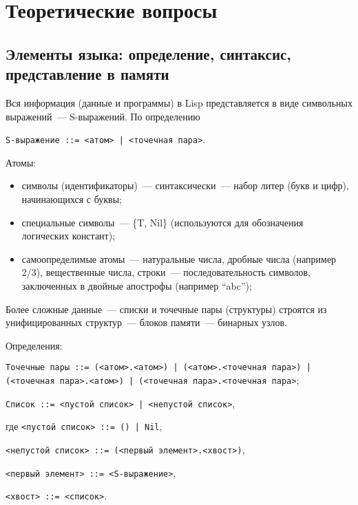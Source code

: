 \chapter{Теоретические вопросы}

\section{Элементы языка: определение, синтаксис, представление в памяти}

Вся информация (данные и программы) в Lisp представляется в виде символьных выражений~--- S-выражений. По определению
\begin{center}
	\texttt{S-выражение ::= <атом> | <точечная пара>}.
\end{center}

Атомы:
\begin{itemize}
	\item символы (идентификаторы)~--- синтаксически~--- набор литер (букв и цифр), начинающихся с буквы;
	\item специальные символы~--- \{T, Nil\} (используются для обозначения логических констант);
	\item самоопределимые атомы~--- натуральные числа, дробные числа (например 2/3), вещественные числа, строки~--- последовательность символов, заключенных в двойные апострофы (например ``abc'');
\end{itemize}

Более сложные данные~--- списки и точечные пары (структуры) строятся из унифицированных структур~--- блоков памяти~--- бинарных узлов.

Определения:

\begin{flushleft}
	\texttt{Точечные пары ::= (<атом>.<атом>) | (<атом>.<точечная пара>) | (<точечная пара>.<атом>) | (<точечная пара>.<точечная пара>};
\end{flushleft}

\begin{flushleft}
	\texttt{Список ::= <пустой список> | <непустой список>}, 
	
	где \texttt{<пустой список> ::= () | Nil},
		
	\hspace{6.8mm} \texttt{<непустой список> ::= (<первый элемент>.<хвост>)},
		
	\hspace{6.8mm} \texttt{<первый элемент> ::= <S-выражение>},
		
	\hspace{6.8mm} \texttt{<хвост> ::= <список>}.
\end{flushleft}

